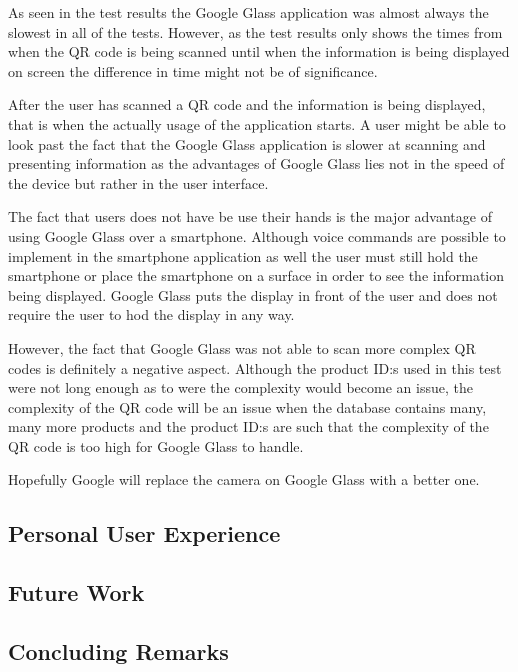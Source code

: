 As seen in the test results the Google Glass application was almost always the slowest in all of the tests. However, as the test results only shows the times from when the QR code is being scanned until when the information is being displayed on screen the difference in time might not be of significance. 

After the user has scanned a QR code and the information is being displayed, that is when the actually usage of the application starts. A user might be able to look past the fact that the Google Glass application is slower at scanning and presenting information as the advantages of Google Glass lies not in the speed of the device but rather in the user interface.

The fact that users does not have be use their hands is the major advantage of using Google Glass over a smartphone. Although voice commands are possible to implement in the smartphone application as well the user must still hold the smartphone or place the smartphone on a surface in order to see the information being displayed. Google Glass puts the display in front of the user and does not require the user to hod the display in any way.

However, the fact that Google Glass was not able to scan more complex QR codes is definitely a negative aspect. Although the product ID:s used in this test were not long enough as to were the complexity would become an issue, the complexity of the QR code will be an issue when the database contains many, many more products and the product ID:s are such that the complexity of the QR code is too high for Google Glass to handle.

Hopefully Google will replace the camera on Google Glass with a better one. 

\subsection{Personal User Experience}
\label{subsec:personalexperience}


\subsection{Future Work}
\label{subsec:futurework}


\subsection{Concluding Remarks}